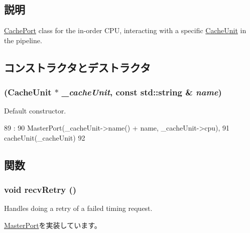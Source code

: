 \subsection{説明}
\hyperlink{classInOrderCPU_1_1CachePort}{CachePort} class for the in-\/order CPU, interacting with a specific \hyperlink{classCacheUnit}{CacheUnit} in the pipeline. 

\subsection{コンストラクタとデストラクタ}
\hypertarget{classInOrderCPU_1_1CachePort_ad623fece786107fa06050327844b38d7}{
\subsubsection[{CachePort}]{ ({\bf CacheUnit} $\ast$ {\em \_\-cacheUnit}, \/  const std::string \& {\em name})}}
\label{classInOrderCPU_1_1CachePort_ad623fece786107fa06050327844b38d7}
Default constructor. 


\begin{DoxyCode}
89                                                         :
90     MasterPort(_cacheUnit->name() + name, _cacheUnit->cpu),
91     cacheUnit(_cacheUnit)
92 { }

\end{DoxyCode}


\subsection{関数}
\hypertarget{classInOrderCPU_1_1CachePort_a29cb5a4f98063ce6e9210eacbdb35298}{
\subsubsection[{recvRetry}]{\setlength{\rightskip}{0pt plus 5cm}void recvRetry ()}}
\label{classInOrderCPU_1_1CachePort_a29cb5a4f98063ce6e9210eacbdb35298}
Handles doing a retry of a failed timing request. 

\hyperlink{classMasterPort_ac1ccc3bcf7ebabb20b57fab99b2be5b0}{MasterPort}を実装しています。


